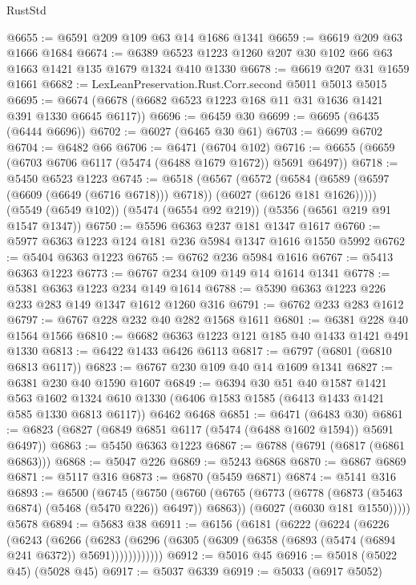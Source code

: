 \begin{lexlean}{RustStd}
\begin{coremodule}
{\begin{coremodule}
{{{{{{{{{{{{{{{{{{{{{{{{{{{{{{{{{{@6655 := @6591 @209 @109 @63 @14 @1686 @1341
@6659 := @6619 @209 @63 @1666 @1684
@6674 := @6389 @6523 @1223 @1260 @207 @30 @102 @66 @63 @1663 @1421 @135 @1679 @1324 @410 @1330
@6678 := @6619 @207 @31 @1659 @1661
@6682 := LexLeanPreservation.Rust.Corr.second @5011 @5013 @5015
@6695 := @6674 (@6678 (@6682 @6523 @1223 @168 @11 @31 @1636 @1421 @391 @1330 @6645 @6117))
@6696 := @6459 @30
@6699 := @6695 (@6435 (@6444 @6696))
@6702 := @6027 (@6465 @30 @61)
@6703 := @6699 @6702
@6704 := @6482 @66
@6706 := @6471 (@6704 @102)
@6716 := @6655 (@6659 (@6703 @6706 @6117 (@5474 (@6488 @1679 @1672)) @5691 @6497))
@6718 := @5450 @6523 @1223
@6745 := @6518
    (@6567
      (@6572
        (@6584 (@6589 (@6597 (@6609 (@6649 (@6716 @6718))) @6718)) (@6027 (@6126 @181 @1626)))))
    (@5549 (@6549 @102))
    (@5474 (@6554 @92 @219))
    (@5356 (@6561 @219 @91 @1547 @1347))
@6750 := @5596 @6363 @237 @181 @1347 @1617
@6760 := @5977 @6363 @1223 @124 @181 @236 @5984 @1347 @1616 @1550 @5992
@6762 := @5404 @6363 @1223
@6765 := @6762 @236 @5984 @1616
@6767 := @5413 @6363 @1223
@6773 := @6767 @234 @109 @149 @14 @1614 @1341
@6778 := @5381 @6363 @1223 @234 @149 @1614
@6788 := @5390 @6363 @1223 @226 @233 @283 @149 @1347 @1612 @1260 @316
@6791 := @6762 @233 @283 @1612
@6797 := @6767 @228 @232 @40 @282 @1568 @1611
@6801 := @6381 @228 @40 @1564 @1566
@6810 := @6682 @6363 @1223 @121 @185 @40 @1433 @1421 @491 @1330
@6813 := @6422 @1433 @6426 @6113
@6817 := @6797 (@6801 (@6810 @6813 @6117))
@6823 := @6767 @230 @109 @40 @14 @1609 @1341
@6827 := @6381 @230 @40 @1590 @1607
@6849 := @6394
    @30
    @51
    @40
    @1587
    @1421
    @563
    @1602
    @1324
    @610
    @1330
    (@6406 @1583 @1585 (@6413 @1433 @1421 @585 @1330 @6813 @6117))
    @6462
    @6468
@6851 := @6471 (@6483 @30)
@6861 := @6823 (@6827 (@6849 @6851 @6117 (@5474 (@6488 @1602 @1594)) @5691 @6497))
@6863 := @5450 @6363 @1223
@6867 := @6788 (@6791 (@6817 (@6861 @6863)))
@6868 := @5047 @226
@6869 := @5243 @6868
@6870 := @6867 @6869
@6871 := @5117 @316
@6873 := @6870 (@5459 @6871)
@6874 := @5141 @316
@6893 := @6500
    (@6745
      (@6750
        (@6760
          (@6765 (@6773 (@6778 (@6873 (@5463 @6874) (@5468 (@5470 @226)) @6497)) @6863))
          (@6027 (@6030 @181 @1550)))))
    @5678
@6894 := @5683 @38
@6911 := @6156
    (@6181
      (@6222
        (@6224
          (@6226
            (@6243
              (@6266
                (@6283
                  (@6296 (@6305 (@6309 (@6358 (@6893 (@5474 (@6894 @241 @6372)) @5691))))))))))))
@6912 := @5016 @45
@6916 := @5018 (@5022 @45) (@5028 @45)
@6917 := @5037 @6339
@6919 := @5033 (@6917 @5052)
}}}}}}}}}}}}}}}}}}}}}}}}}}}}}}}}}}
\end{coremodule}}
\end{coremodule}
\end{lexlean}
